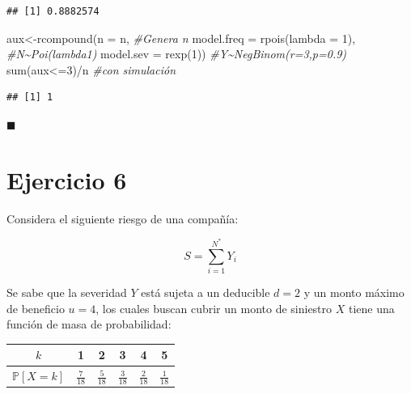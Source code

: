 \documentclass[
]{article}
\newenvironment{Shaded}{\begin{snugshade}}{\end{snugshade}}
\newcommand{\AttributeTok}[1]{\textcolor[rgb]{0.77,0.63,0.00}{#1}}
\newcommand{\CommentTok}[1]{\textcolor[rgb]{0.56,0.35,0.01}{\textit{#1}}}
\newcommand{\DecValTok}[1]{\textcolor[rgb]{0.00,0.00,0.81}{#1}}
\newcommand{\FunctionTok}[1]{\textcolor[rgb]{0.00,0.00,0.00}{#1}}
\newcommand{\NormalTok}[1]{#1}
\newcommand{\OtherTok}[1]{\textcolor[rgb]{0.56,0.35,0.01}{#1}}
\newcommand{\SpecialCharTok}[1]{\textcolor[rgb]{0.00,0.00,0.00}{#1}}
\begin{document}
\begin{verbatim}
## [1] 0.8882574
\end{verbatim}

\begin{Shaded}
\begin{Highlighting}[]
\NormalTok{aux}\OtherTok{\textless{}{-}}\FunctionTok{rcompound}\NormalTok{(}\AttributeTok{n =}\NormalTok{ n, }\CommentTok{\#Genera n}
                \AttributeTok{model.freq =} \FunctionTok{rpois}\NormalTok{(}\AttributeTok{lambda =} \DecValTok{1}\NormalTok{), }\CommentTok{\#N\textasciitilde{}Poi(lambda1)}
                \AttributeTok{model.sev =} \FunctionTok{rexp}\NormalTok{(}\DecValTok{1}\NormalTok{)) }\CommentTok{\#Y\textasciitilde{}NegBinom(r=3,p=0.9)}
\FunctionTok{sum}\NormalTok{(aux}\SpecialCharTok{\textless{}=}\DecValTok{3}\NormalTok{)}\SpecialCharTok{/}\NormalTok{n }\CommentTok{\#con simulación}
\end{Highlighting}
\end{Shaded}

\begin{verbatim}
## [1] 1
\end{verbatim}

\(\blacksquare\)

\hypertarget{ejercicio-6}{%
\section{Ejercicio 6}\label{ejercicio-6}}

Considera el siguiente riesgo de una compañía:

\[S=\sum_{i=1}^{N^*} Y_i\]

Se sabe que la severidad \(Y\) está sujeta a un deducible \(d=2\) y un
monto máximo de beneficio \(u=4\), los cuales buscan cubrir un monto de
siniestro \(X\) tiene una función de masa de probabilidad:

\vspace{-0.5cm}

\begin{center}
\begin{tabular}{|c|c|c|c|c|c|}
\hline
$k$ & 1 & 2 & 3 & 4 & 5   \\  \hline 
\rule[-1.5ex]{0pt}{4ex}$\mathbb{P}\left[X=k\right]$  & $\frac{7}{18}$ & $\frac{5}{18}$ & $\frac{3}{18}$ & $\frac{2}{18}$ & $\frac{1}{18}$ \\  \hline
\end{tabular}
\end{center}
\end{document}
